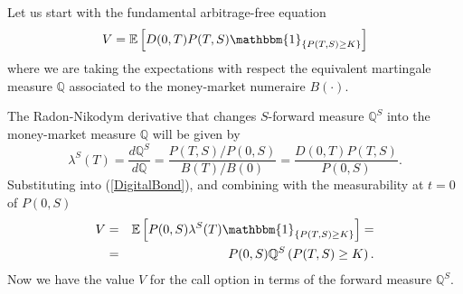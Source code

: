 \begin{demo}
Let us start with the fundamental arbitrage-free equation
\begin{equation}
\label{DigitalBond}
V=\mathbb{E}\left[ D(0,T) P(T,S)\mathbbm{1}_{\{P(T,S)\geq
    K\}}\right] 
\end{equation}
where we are taking the expectations with respect the equivalent
martingale measure $\mathbb{Q}$ associated to the money-market
numeraire $B(\cdot)$.

The Radon-Nikodym derivative that changes $S$-forward
measure $\mathbb{Q}^S$ into the money-market measure $\mathbb{Q}$ will be
given by
$$
\lambda^S(T)=\frac{d\mathbb{Q}^S}{d\mathbb{Q}}=\frac{P(T,S)/P(0,S)}{B(T)/B(0)}=\frac{D(0,T)P(T,S)}{P(0,S)}.
$$
Substituting into (\ref{DigitalBond}), and combining with the
measurability at $t=0$ of $P(0,S)$ 
\begin{eqnarray} 
\nonumber
V &=& \mathbb{E}\left[ P(0,S) \lambda^S(T) \mathbbm{1}_{\{P(T,S)\geq
    K\}}\right] = \\
\nonumber
 &=& P(0,S) \mathbb{Q}^S\left( P(T,S)\geq K\right).
\end{eqnarray}
Now we have the value $V$ for the call option in terms of the forward
measure $\mathbb{Q}^S$. %

\end{demo}
